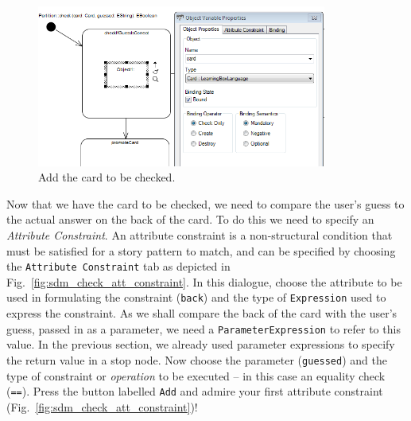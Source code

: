 \begin{figure}[htbp]
\begin{center}
  \includegraphics[width=0.85\textwidth]{pics/sdmBilder/check/sdm17RAW}
  \caption{Add the card to be checked.}  
  \label{fig:sdm_check_addCard}
\end{center}
\end{figure}

Now that we have the card to be checked, we need to compare the user's guess to
the actual answer on the back of the card.  To do this we need to specify an
\emph{Attribute Constraint}.  An attribute constraint is a
non-structural condition that must be satisfied for a story pattern to match,
and can be specified by choosing the \texttt{Attribute Constraint} tab as
depicted in Fig.~\ref{fig:sdm_check_att_constraint}.  In this dialogue, choose
the attribute to be used in formulating the constraint (\texttt{back}) and the
type of \texttt{Expression} used to express the constraint.  As we shall compare
the back of the card with the user's guess, passed in as a parameter, we need a
\texttt{ParameterExpression} to refer to this value.  In the previous section,
we already used parameter expressions to specify the return value in a stop
node.  Now choose the parameter (\texttt{guessed}) and the type of
constraint or \emph{operation} to be executed -- in this case an equality check
(\texttt{==}). Press the button labelled \texttt{Add} and admire your first
attribute constraint (Fig.~\ref{fig:sdm_check_att_constraint})!

